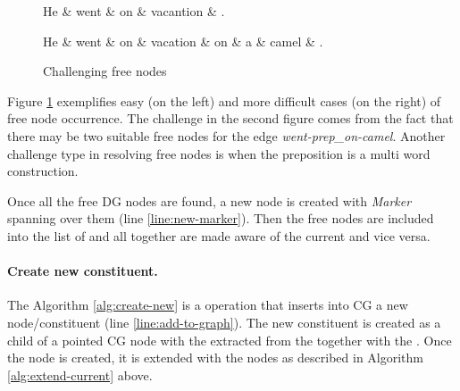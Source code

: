 \begin{figure}[!ht]
\centering
\begin{minipage}[b]{0.45\textwidth}
\centering
	\begin{dependency}
		\begin{deptext}[]
	He \& went \& on \& vacantion \& . \\
		\end{deptext}
	\end{dependency}
\end{minipage}
\begin{minipage}[b]{0.45\textwidth}
	\begin{dependency}
		\begin{deptext}[]
	He \& went \& on \& vacation \& on \& a \& camel \& . \\
		\end{deptext}
	\end{dependency}
\end{minipage}
\caption{Challenging free nodes}
\label{fig:challenging-free-nodes}
\end{figure}

Figure \ref{fig:challenging-free-nodes} exemplifies easy (on the left) and more difficult cases (on the right) of free node occurrence. The challenge in the second figure comes from the fact that there may be two suitable free nodes for the edge \textit{went-\mbox{prep\_on}-camel}. Another challenge type in resolving free nodes is when the preposition is a multi word construction. 

Once all the free DG nodes are found, a new \cg node is created with \textit{Marker} \elementType spanning over them (line \ref{line:new-marker}). Then the free nodes are included into the list of \Children and all together are made aware of the current \cgPointer and vice versa. 

\paragraph{Create new constituent.} The Algorithm \ref{alg:create-new} is a operation that inserts into CG a new node/constituent (line \ref{line:add-to-graph}). The new constituent is created as a child of a pointed CG node with the \elementType extracted from the \rt together with the \operation. Once the \cg node is created, it is extended with the \Children nodes as described in Algorithm \ref{alg:extend-current} above.

